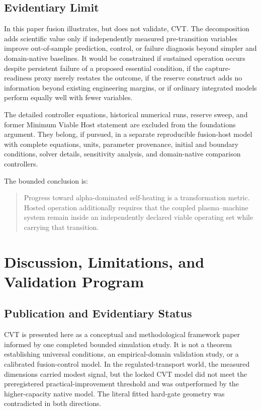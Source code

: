 \documentclass[11pt]{article}
\begin{document}
\subsection{Evidentiary Limit}

In this paper fusion illustrates, but does not validate, CVT. The decomposition adds scientific value only if independently measured pre-transition variables improve out-of-sample prediction, control, or failure diagnosis beyond simpler and domain-native baselines. It would be constrained if sustained operation occurs despite persistent failure of a proposed essential condition, if the capture-readiness proxy merely restates the outcome, if the reserve construct adds no information beyond existing engineering margins, or if ordinary integrated models perform equally well with fewer variables.

The detailed controller equations, historical numerical runs, reserve sweep, and former Minimum Viable Host statement are excluded from the foundations argument. They belong, if pursued, in a separate reproducible fusion-host model with complete equations, units, parameter provenance, initial and boundary conditions, solver details, sensitivity analysis, and domain-native comparison controllers.

The bounded conclusion is:
\begin{quote}
Progress toward alpha-dominated self-heating is a transformation metric. Hosted operation additionally requires that the coupled plasma--machine system remain inside an independently declared viable operating set while carrying that transition.
\end{quote}

\section{Discussion, Limitations, and Validation Program}
\label{sec:discussion}

\subsection{Publication and Evidentiary Status}

CVT is presented here as a conceptual and methodological framework paper informed by one completed bounded simulation study. It is not a theorem establishing universal conditions, an empirical-domain validation study, or a calibrated fusion-control model. In the regulated-transport world, the measured dimensions carried modest signal, but the locked CVT model did not meet the preregistered practical-improvement threshold and was outperformed by the higher-capacity native model. The literal fitted hard-gate geometry was contradicted in both directions.
\end{document}
